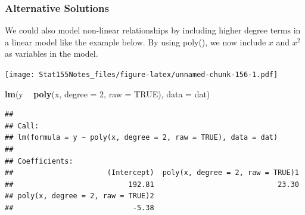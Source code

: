 \documentclass[]{book}
\newenvironment{Shaded}{\begin{snugshade}}{\end{snugshade}}
\newcommand{\DataTypeTok}[1]{\textcolor[rgb]{0.13,0.29,0.53}{#1}}
\newcommand{\DecValTok}[1]{\textcolor[rgb]{0.00,0.00,0.81}{#1}}
\newcommand{\KeywordTok}[1]{\textcolor[rgb]{0.13,0.29,0.53}{\textbf{#1}}}
\newcommand{\NormalTok}[1]{#1}
\newcommand{\OperatorTok}[1]{\textcolor[rgb]{0.81,0.36,0.00}{\textbf{#1}}}
\newcommand{\OtherTok}[1]{\textcolor[rgb]{0.56,0.35,0.01}{#1}}
\newcommand{\StringTok}[1]{\textcolor[rgb]{0.31,0.60,0.02}{#1}}
\begin{document}
\hypertarget{alternative-solutions}{%
\subsubsection{Alternative Solutions}\label{alternative-solutions}}

We could also model non-linear relationships by including higher degree terms in a linear model like the example below. By using poly(), we now include \(x\) and \(x^2\) as variables in the model.

\begin{Shaded}
\end{Shaded}

\texttt{[image: Stat155Notes\_files/figure-latex/unnamed-chunk-156-1.pdf]}

\begin{Shaded}
\begin{Highlighting}[]
\KeywordTok{lm}\NormalTok{(y }\OperatorTok{~}\StringTok{ }\KeywordTok{poly}\NormalTok{(x, }\DataTypeTok{degree =} \DecValTok{2}\NormalTok{, }\DataTypeTok{raw =} \OtherTok{TRUE}\NormalTok{), }\DataTypeTok{data =}\NormalTok{ dat)}
\end{Highlighting}
\end{Shaded}

\begin{verbatim}
## 
## Call:
## lm(formula = y ~ poly(x, degree = 2, raw = TRUE), data = dat)
## 
## Coefficients:
##                      (Intercept)  poly(x, degree = 2, raw = TRUE)1  
##                           192.81                             23.30  
## poly(x, degree = 2, raw = TRUE)2  
##                            -5.38
\end{verbatim}
\end{document}

